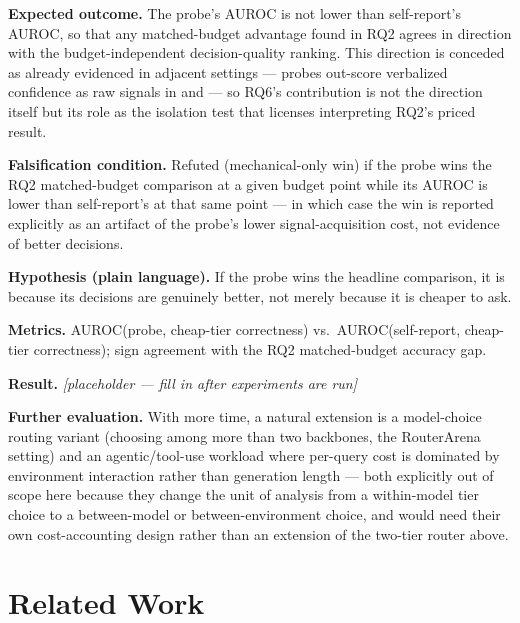 \documentclass[11pt]{article}
\newcommand{\ph}{\textit{[placeholder --- fill in after experiments are run]}}
\begin{document}
\textbf{Expected outcome.} The probe's AUROC is not lower than self-report's AUROC, so that any matched-budget advantage found in RQ2 agrees in direction with the budget-independent decision-quality ranking. This direction is conceded as already evidenced in adjacent settings --- probes out-score verbalized confidence as raw signals in \citet{LinearJudgeProbes2512} and \citet{HiddenError2605} --- so RQ6's contribution is not the direction itself but its role as the isolation test that licenses interpreting RQ2's priced result.

\textbf{Falsification condition.} Refuted (mechanical-only win) if the probe wins the RQ2 matched-budget comparison at a given budget point while its AUROC is lower than self-report's at that same point --- in which case the win is reported explicitly as an artifact of the probe's lower signal-acquisition cost, not evidence of better decisions.

\textbf{Hypothesis (plain language).} If the probe wins the headline comparison, it is because its decisions are genuinely better, not merely because it is cheaper to ask.

\textbf{Metrics.} AUROC(probe, cheap-tier correctness) vs.\ AUROC(self-report, cheap-tier correctness); sign agreement with the RQ2 matched-budget accuracy gap.

\textbf{Result.} \ph

\vspace{0.5em}
\noindent\textbf{Further evaluation.} With more time, a natural extension is a model-choice routing variant (choosing among more than two backbones, the RouterArena setting) and an agentic/tool-use workload where per-query cost is dominated by environment interaction rather than generation length --- both explicitly out of scope here because they change the unit of analysis from a within-model tier choice to a between-model or between-environment choice, and would need their own cost-accounting design rather than an extension of the two-tier router above.

\section{Related Work}
\end{document}
